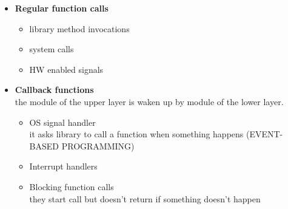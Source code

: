 \begin{itemize}
\item{\textbf{Regular function calls}
\begin{itemize}
\item{library method invocations}
\item{system calls}
\item{HW enabled signals}
\end{itemize}
}
\item{\textbf{Callback functions}\\
the module of the upper layer is waken up by module of the lower layer.
\begin{itemize}
\item{OS signal handler\\
it asks library to call a function when something happens (EVENT-BASED PROGRAMMING)}
\item{Interrupt handlers}
\item{Blocking function calls\\
they start call but doesn't return if something doesn't happen}
\end{itemize}
}
\end{itemize}

